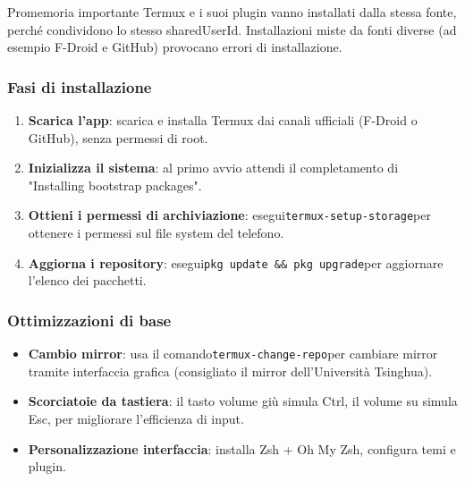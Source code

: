 \begin{tcbwarn}{Promemoria importante}
Termux e i suoi plugin vanno installati dalla stessa fonte, perché condividono lo stesso sharedUserId. Installazioni miste da fonti diverse (ad esempio F-Droid e GitHub) provocano errori di installazione.

\end{tcbwarn}


\subsubsection*{Fasi di installazione}

\begin{enumerate}
  \item \textbf{Scarica l'app}: scarica e installa Termux dai canali ufficiali (F-Droid o GitHub), senza permessi di root.
  \item \textbf{Inizializza il sistema}: al primo avvio attendi il completamento di "Installing bootstrap packages".
  \item \textbf{Ottieni i permessi di archiviazione}: esegui\texttt{termux-\allowbreak setup-\allowbreak storage}per ottenere i permessi sul file system del telefono.
  \item \textbf{Aggiorna i repository}: esegui\texttt{pkg update \&\& pkg upgrade}per aggiornare l'elenco dei pacchetti.
\end{enumerate}

\subsubsection*{Ottimizzazioni di base}

\begin{itemize}
  \item \textbf{Cambio mirror}: usa il comando\texttt{termux-\allowbreak change-\allowbreak repo}per cambiare mirror tramite interfaccia grafica (consigliato il mirror dell'Università Tsinghua).
  \item \textbf{Scorciatoie da tastiera}: il tasto volume giù simula Ctrl, il volume su simula Esc, per migliorare l'efficienza di input.
  \item \textbf{Personalizzazione interfaccia}: installa Zsh + Oh My Zsh, configura temi e plugin.
\end{itemize}



